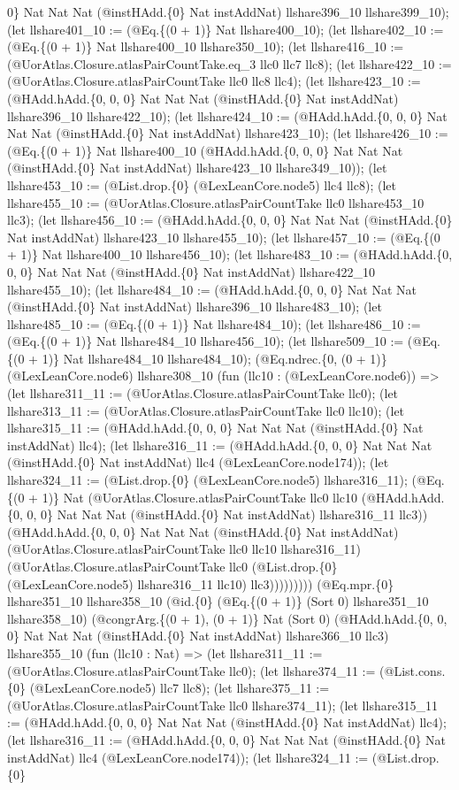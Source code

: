 \documentclass[11pt]{article}
\begin{document}
0\} Nat Nat Nat (@instHAdd.\{0\} Nat instAddNat) llshare396\_10 llshare399\_10); (let llshare401\_10 := (@Eq.\{(0 + 1)\} Nat llshare400\_10); (let llshare402\_10 := (@Eq.\{(0 + 1)\} Nat llshare400\_10 llshare350\_10); (let llshare416\_10 := (@UorAtlas.Closure.atlasPairCountTake.eq\_3 llc0 llc7 llc8); (let llshare422\_10 := (@UorAtlas.Closure.atlasPairCountTake llc0 llc8 llc4); (let llshare423\_10 := (@HAdd.hAdd.\{0, 0, 0\} Nat Nat Nat (@instHAdd.\{0\} Nat instAddNat) llshare396\_10 llshare422\_10); (let llshare424\_10 := (@HAdd.hAdd.\{0, 0, 0\} Nat Nat Nat (@instHAdd.\{0\} Nat instAddNat) llshare423\_10); (let llshare426\_10 := (@Eq.\{(0 + 1)\} Nat llshare400\_10 (@HAdd.hAdd.\{0, 0, 0\} Nat Nat Nat (@instHAdd.\{0\} Nat instAddNat) llshare423\_10 llshare349\_10)); (let llshare453\_10 := (@List.drop.\{0\} (@LexLeanCore.node5) llc4 llc8); (let llshare455\_10 := (@UorAtlas.Closure.atlasPairCountTake llc0 llshare453\_10 llc3); (let llshare456\_10 := (@HAdd.hAdd.\{0, 0, 0\} Nat Nat Nat (@instHAdd.\{0\} Nat instAddNat) llshare423\_10 llshare455\_10); (let llshare457\_10 := (@Eq.\{(0 + 1)\} Nat llshare400\_10 llshare456\_10); (let llshare483\_10 := (@HAdd.hAdd.\{0, 0, 0\} Nat Nat Nat (@instHAdd.\{0\} Nat instAddNat) llshare422\_10 llshare455\_10); (let llshare484\_10 := (@HAdd.hAdd.\{0, 0, 0\} Nat Nat Nat (@instHAdd.\{0\} Nat instAddNat) llshare396\_10 llshare483\_10); (let llshare485\_10 := (@Eq.\{(0 + 1)\} Nat llshare484\_10); (let llshare486\_10 := (@Eq.\{(0 + 1)\} Nat llshare484\_10 llshare456\_10); (let llshare509\_10 := (@Eq.\{(0 + 1)\} Nat llshare484\_10 llshare484\_10); (@Eq.ndrec.\{0, (0 + 1)\} (@LexLeanCore.node6) llshare308\_10 (fun (llc10 : (@LexLeanCore.node6)) => (let llshare311\_11 := (@UorAtlas.Closure.atlasPairCountTake llc0); (let llshare313\_11 := (@UorAtlas.Closure.atlasPairCountTake llc0 llc10); (let llshare315\_11 := (@HAdd.hAdd.\{0, 0, 0\} Nat Nat Nat (@instHAdd.\{0\} Nat instAddNat) llc4); (let llshare316\_11 := (@HAdd.hAdd.\{0, 0, 0\} Nat Nat Nat (@instHAdd.\{0\} Nat instAddNat) llc4 (@LexLeanCore.node174)); (let llshare324\_11 := (@List.drop.\{0\} (@LexLeanCore.node5) llshare316\_11); (@Eq.\{(0 + 1)\} Nat (@UorAtlas.Closure.atlasPairCountTake llc0 llc10 (@HAdd.hAdd.\{0, 0, 0\} Nat Nat Nat (@instHAdd.\{0\} Nat instAddNat) llshare316\_11 llc3)) (@HAdd.hAdd.\{0, 0, 0\} Nat Nat Nat (@instHAdd.\{0\} Nat instAddNat) (@UorAtlas.Closure.atlasPairCountTake llc0 llc10 llshare316\_11) (@UorAtlas.Closure.atlasPairCountTake llc0 (@List.drop.\{0\} (@LexLeanCore.node5) llshare316\_11 llc10) llc3))))))))) (@Eq.mpr.\{0\} llshare351\_10 llshare358\_10 (@id.\{0\} (@Eq.\{(0 + 1)\} (Sort 0) llshare351\_10 llshare358\_10) (@congrArg.\{(0 + 1), (0 + 1)\} Nat (Sort 0) (@HAdd.hAdd.\{0, 0, 0\} Nat Nat Nat (@instHAdd.\{0\} Nat instAddNat) llshare366\_10 llc3) llshare355\_10 (fun (llc10 : Nat) => (let llshare311\_11 := (@UorAtlas.Closure.atlasPairCountTake llc0); (let llshare374\_11 := (@List.cons.\{0\} (@LexLeanCore.node5) llc7 llc8); (let llshare375\_11 := (@UorAtlas.Closure.atlasPairCountTake llc0 llshare374\_11); (let llshare315\_11 := (@HAdd.hAdd.\{0, 0, 0\} Nat Nat Nat (@instHAdd.\{0\} Nat instAddNat) llc4); (let llshare316\_11 := (@HAdd.hAdd.\{0, 0, 0\} Nat Nat Nat (@instHAdd.\{0\} Nat instAddNat) llc4 (@LexLeanCore.node174)); (let llshare324\_11 := (@List.drop.\{0\} 
\end{document}
